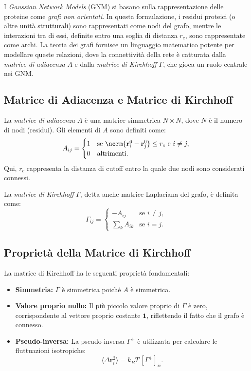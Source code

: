 \documentclass[Lau,binding=0.6cm,oneside,noexaminfo]{sapthesis}
\begin{document}
I \emph{Gaussian Network Models} (GNM) si basano sulla rappresentazione delle proteine come \emph{grafi non orientati}. In questa formulazione, i residui proteici (o altre unità strutturali) sono rappresentati come nodi del grafo, mentre le interazioni tra di essi, definite entro una soglia di distanza \( r_c \), sono rappresentate come archi. La teoria dei grafi fornisce un linguaggio matematico potente per modellare queste relazioni, dove la connettività della rete è catturata dalla \emph{matrice di adiacenza} \( A \) e dalla \emph{matrice di Kirchhoff} \( \Gamma \), che gioca un ruolo centrale nei GNM.

\subsection{Matrice di Adiacenza e Matrice di Kirchhoff}
La \emph{matrice di adiacenza} \( A \) è una matrice simmetrica \( N \times N \), dove \( N \) è il numero di nodi (residui). Gli elementi di \( A \) sono definiti come:
\begin{equation}
    A_{ij} = 
    \begin{cases} 
        1 & \text{se } \norm{\mathbf{r}_i^0 - \mathbf{r}_j^0} \leq r_c \text{ e } i \neq j, \\
        0 & \text{altrimenti}.
    \end{cases}
\end{equation}
Qui, \( r_c \) rappresenta la distanza di cutoff entro la quale due nodi sono considerati connessi.

La \emph{matrice di Kirchhoff} \( \Gamma \), detta anche matrice Laplaciana del grafo, è definita come:
\begin{equation}
    \Gamma_{ij} = 
    \begin{cases} 
        -A_{ij} & \text{se } i \neq j, \\
        \sum_{k} A_{ik} & \text{se } i = j.
    \end{cases}
\end{equation}

\subsection{Proprietà della Matrice di Kirchhoff}
La matrice di Kirchhoff ha le seguenti proprietà fondamentali:
\begin{itemize}
    \item \textbf{Simmetria:} \( \Gamma \) è simmetrica poiché \( A \) è simmetrica.
    \item \textbf{Valore proprio nullo:} Il più piccolo valore proprio di \( \Gamma \) è zero, corrispondente al vettore proprio costante \( \mathbf{1} \), riflettendo il fatto che il grafo è connesso.
    \item \textbf{Pseudo-inversa:} La pseudo-inversa \( \Gamma^+ \) è utilizzata per calcolare le fluttuazioni isotropiche:
    \begin{equation}
        \langle \Delta \mathbf{r}_i^2 \rangle = k_B T \, [\Gamma^+]_{ii}.
    \end{equation}
\end{itemize}
\end{document}
